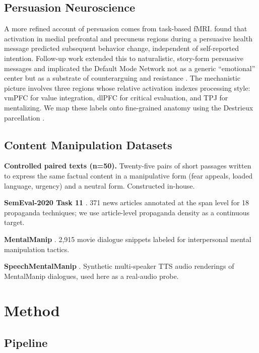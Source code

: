 \documentclass[11pt]{article}
\begin{document}
\subsection{Persuasion Neuroscience}

A more refined account of persuasion comes from task-based fMRI. \citet{falk2010predicting} found that activation in medial prefrontal and precuneus regions during a persuasive health message predicted subsequent behavior change, independent of self-reported intention. Follow-up work extended this to naturalistic, story-form persuasive messages and implicated the Default Mode Network not as a generic ``emotional'' center but as a substrate of counterarguing and resistance \cite{ntoumanis2024deciphering}. The mechanistic picture involves three regions whose relative activation indexes processing style: vmPFC for value integration, dlPFC for critical evaluation, and TPJ for mentalizing. We map these labels onto fine-grained anatomy using the Destrieux parcellation \cite{destrieux2010automatic}.

\subsection{Content Manipulation Datasets}

\textbf{Controlled paired texts (n=50).} Twenty-five pairs of short passages written to express the same factual content in a manipulative form (fear appeals, loaded language, urgency) and a neutral form. Constructed in-house.

\textbf{SemEval-2020 Task 11} \cite{dasanmartino2020semeval}. 371 news articles annotated at the span level for 18 propaganda techniques; we use article-level propaganda density as a continuous target.

\textbf{MentalManip} \cite{wang2024mentalmanip}. 2{,}915 movie dialogue snippets labeled for interpersonal mental manipulation tactics.

\textbf{SpeechMentalManip} \cite{chen2026detecting}. Synthetic multi-speaker TTS audio renderings of MentalManip dialogues, used here as a real-audio probe.

\section{Method}
\label{sec:method}

\subsection{Pipeline}
\end{document}
